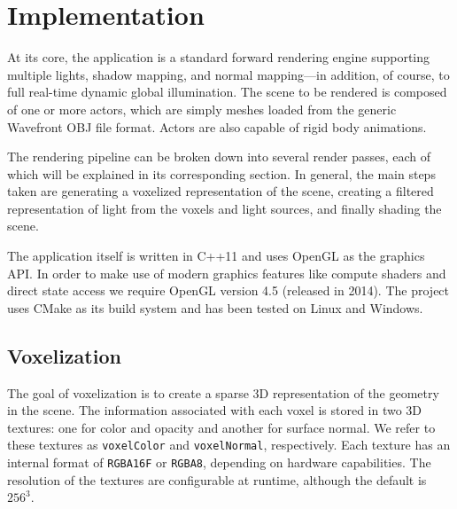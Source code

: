 \chapter{Implementation}

At its core, the application is a standard forward rendering engine supporting multiple lights, shadow mapping, and normal mapping---in addition, of course, to full real-time dynamic global illumination. The scene to be rendered is composed of one or more actors, which are simply meshes loaded from the generic Wavefront OBJ file format. Actors are also capable of rigid body animations.

The rendering pipeline can be broken down into several render passes, each of which will be explained in its corresponding section. In general, the main steps taken are generating a voxelized representation of the scene, creating a filtered representation of light from the voxels and light sources, and finally shading the scene.

The application itself is written in C++11 and uses OpenGL as the graphics API. In order to make use of modern graphics features like compute shaders and direct state access we require OpenGL version 4.5 (released in 2014). The project uses CMake as its build system and has been tested on Linux and Windows.



\section{Voxelization}
The goal of voxelization is to create a sparse 3D representation of the geometry in the scene. The information associated with each voxel is stored in two 3D textures: one for color and opacity and another for surface normal. We refer to these textures as \texttt{voxelColor} and \texttt{voxelNormal}, respectively. Each texture has an internal format of \texttt{RGBA16F} or \texttt{RGBA8}, depending on hardware capabilities. The resolution of the textures are configurable at runtime, although the default is $256^3$.

